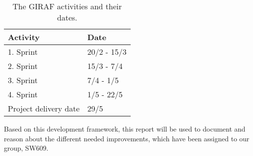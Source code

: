 \begin{table}[H]
\centering
\begin{tabular}{|l|l|}
\hline
Activity & Date \\ \hline
1. Sprint & 20/2 - 15/3 \\\hline 
2. Sprint & 15/3 - 7/4\\\hline 
3. Sprint & 7/4 - 1/5\\\hline 
4. Sprint & 1/5 - 22/5\\\hline 
Project delivery date & 29/5\\\hline
\end{tabular}
\caption{The GIRAF activities and their dates.}
\label{TableActivity}
\end{table}

Based on this development framework, this report will be used to document and
reason about the different needed improvements, which have been assigned to our
group, SW609.